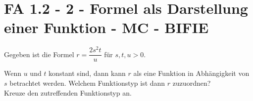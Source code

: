 \section{FA 1.2 - 2 - Formel als Darstellung einer Funktion - MC - BIFIE}

\begin{beispiel}[FA 1.2]{1} %
Gegeben ist die Formel $r=\dfrac{2s^2t}{u}$ für $s,t,u>0$.

Wenn $u$ und $t$ konstant sind, dann kann $r$ als eine Funktion in Abhängigkeit von $s$ betrachtet werden. Welchem Funktionstyp ist dann $r$ zuzuordnen? \\
Kreuze den zutreffenden Funktionstyp an. 


\end{beispiel}